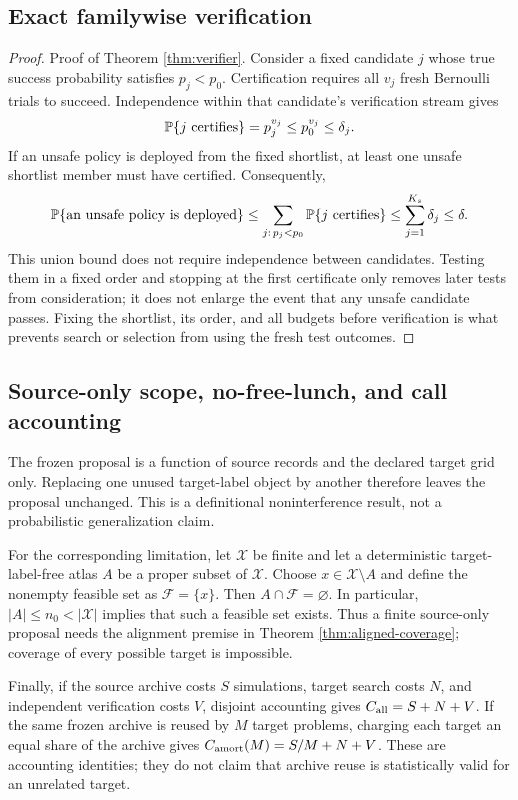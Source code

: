 \subsection{Exact familywise verification}\label{app:proof-verifier}

\begin{proof}{Proof of Theorem \ref{thm:verifier}.}
Consider a fixed candidate $j$ whose true success probability satisfies
$p_j<p_0$.  Certification requires all $v_j$ fresh Bernoulli trials to
succeed.  Independence within that candidate's verification stream gives
\[
 \mathbb{P}\{j\text{ certifies}\}=p_j^{v_j}
 \le p_0^{v_j}\le\delta_j.
\]
If an unsafe policy is deployed from the fixed shortlist, at least one unsafe
shortlist member must have certified.  Consequently,
\[
 \mathbb{P}\{\text{an unsafe policy is deployed}\}
 \le \sum_{j:\,p_j<p_0}\mathbb{P}\{j\text{ certifies}\}
 \le \sum_{j=1}^{K_s}\delta_j
 \le\delta.
\]
This union bound does not require independence between candidates.  Testing
them in a fixed order and stopping at the first certificate only removes later
tests from consideration; it does not enlarge the event that any unsafe
candidate passes.  Fixing the shortlist, its order, and all budgets before
verification is what prevents search or selection from using the fresh test
outcomes.
\end{proof}

\subsection{Source-only scope, no-free-lunch, and call accounting}
\label{app:proof-scope}

The frozen proposal is a function of source records and the declared target
grid only.  Replacing one unused target-label object by another therefore
leaves the proposal unchanged.  This is a definitional noninterference result,
not a probabilistic generalization claim.

For the corresponding limitation, let $\mathcal X$ be finite and let a
deterministic target-label-free atlas $A$ be a proper subset of $\mathcal X$.
Choose $x\in\mathcal X\setminus A$ and define the nonempty feasible set as
$\mathcal F=\{x\}$.  Then $A\cap\mathcal F=\varnothing$.  In particular,
$|A|\le n_0<|\mathcal X|$ implies that such a feasible set exists.  Thus a
finite source-only proposal needs the alignment premise in Theorem
\ref{thm:aligned-coverage}; coverage of every possible target is impossible.

Finally, if the source archive costs $S$ simulations, target search costs $N$,
and independent verification costs $V$, disjoint accounting gives
$C_{\rm all}=S+N+V$.  If the same frozen archive is reused by $M$ target
problems, charging each target an equal share of the archive gives
$C_{\rm amort}(M)=S/M+N+V$.  These are accounting identities; they do not claim
that archive reuse is statistically valid for an unrelated target.

